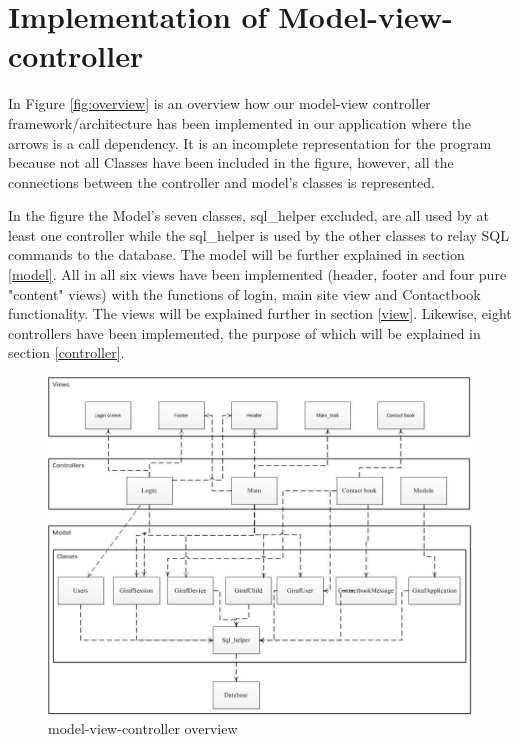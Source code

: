 \section{Implementation of Model-view-controller}
In Figure \vref{fig:overview} is an overview how our model-view controller framework/architecture has been implemented in our application where the arrows is a call dependency. It is an incomplete representation for the program because not all Classes have been included in the figure, however, all the connections between the controller and model's classes is represented. 

In the figure the Model's seven classes, sql\_helper excluded, are all used by at least one controller while the sql\_helper is used by the other classes to relay SQL commands to the database. The model will be further explained in section \vref{model}. All in all six views have been implemented (header, footer and four pure "content" views) with the functions of login, main site view and Contactbook functionality. The views will be explained further in section \vref{view}. Likewise, eight controllers have been implemented, the purpose of which will be explained in section \vref{controller}.

\begin{figure}
	\centering
		\includegraphics[width=1.00\textwidth]{img/overview.jpg}
	\caption{model-view-controller overview}
	\label{fig:overview}
\end{figure}
